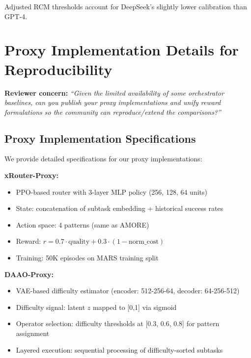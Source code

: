 \documentclass{article}
\theoremstyle{plain}
\theoremstyle{definition}
\theoremstyle{remark}
\begin{document}
Adjusted RCM thresholds account for DeepSeek's slightly lower calibration than GPT-4.

\section{Proxy Implementation Details for Reproducibility}
\label{app:proxy-details}

\textbf{Reviewer concern:} \textit{``Given the limited availability of some orchestrator baselines, can you publish your proxy implementations and unify reward formulations so the community can reproduce/extend the comparisons?''}

\subsection{Proxy Implementation Specifications}

We provide detailed specifications for our proxy implementations:

\textbf{xRouter-Proxy:}
\begin{itemize}[nosep,leftmargin=*]
\item PPO-based router with 3-layer MLP policy (256, 128, 64 units)
\item State: concatenation of subtask embedding + historical success rates
\item Action space: 4 patterns (same as AMORE)
\item Reward: $r = 0.7 \cdot \text{quality} + 0.3 \cdot (1 - \text{norm\_cost})$
\item Training: 50K episodes on MARS training split
\end{itemize}

\textbf{DAAO-Proxy:}
\begin{itemize}[nosep,leftmargin=*]
\item VAE-based difficulty estimator (encoder: 512-256-64, decoder: 64-256-512)
\item Difficulty signal: latent $z$ mapped to [0,1] via sigmoid
\item Operator selection: difficulty thresholds at [0.3, 0.6, 0.8] for pattern assignment
\item Layered execution: sequential processing of difficulty-sorted subtasks
\end{itemize}
\end{document}
